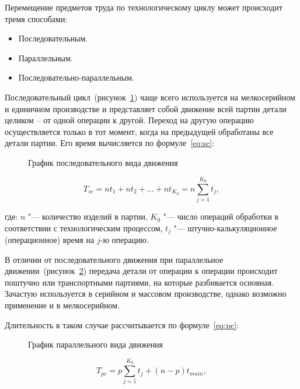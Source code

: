 Перемещение предметов труда по технологическому циклу может происходит тремя способами:

\begin{itemize}
 	\item Последовательным.
	\item Параллельным.
    \item Последовательно-параллельным.
\end{itemize}

Последовательный цикл~(рисунок~\cref{fig:seq}) чаще всего используется на мелкосерийном и единичном производстве и представляет собой движение всей партии детали целиком -- от одной операции к другой. Переход на другую операцию осуществляется только в тот момент, когда на предыдущей обработаны все детали партии.
Его время вычисляется по формуле~\cref{eq:sc}:

\begin{figure}[!htb]
	\caption{График последовательного вида движения}\label{fig:seq}
\end{figure}

\begin{equation}
T_{sc} = n t_{1} + n t_{2} + \ldots + n t_{K_0} = n \sum_{j=1}^{K_{0}}t_{j},
\label{eq:sc}
\end{equation}


\noindent где: $n$ "--- количество изделий в партии, $K_{0}$ "--- число операций обработки в соответствии с технологическим процессом,  $t_{j}$ "--- штучно-калькуляционное (операционное) время на $j$-ю операцию.

В отличии от последовательного движения при параллельное движении~(рисунок~\cref{fig:parallel}) передача детали от операции к операции происходит поштучно или транспортными партиями, на которые разбивается основная. Зачастую используется в серийном и массовом производстве, однако возможно применение и в мелкосерийном.

Длительность в таком случае рассчитывается по формуле~\cref{eq:pc}:

\begin{figure}[!htb]
	\caption{График параллельного вида движения}\label{fig:parallel}
\end{figure}

\begin{equation}
T_{pc} = p\sum_{j=1}^{K_{0}}t_{j}+(n-p)t_{main},
\label{eq:pc}
\end{equation}

